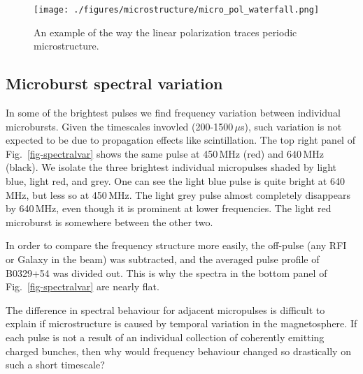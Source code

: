 \begin{figure}[!h]
\vspace{-0.1cm}
\begin{center}
\texttt{[image: ./figures/microstructure/micro\_pol\_waterfall.png]}
\caption{An example of the way the linear polarization 
     traces periodic microstructure.}
\label{fig-polwaterfall}
\end{center}
\end{figure}

\subsection{Microburst spectral variation}

In some of the brightest pulses we find frequency 
variation between individual microbursts. Given 
the timescales invovled (200-1500\,$\mu$s), such 
variation is not expected to be due to propagation 
effects like scintillation. The top right panel of 
Fig.~\ref{fig-spectralvar} shows the same pulse at 
450\,MHz (red) and 640\,MHz (black). We isolate the
three brightest individual micropulses shaded by 
light blue, light red, and grey. One can see the 
light blue pulse is quite bright at 640\,MHz, 
but less so at 450\,MHz. The light grey pulse almost 
completely disappears by 640\,MHz, even though 
it is prominent at lower frequencies. The light 
red microburst is somewhere between the other two.

In order to 
compare the frequency structure more easily, the off-pulse 
(any RFI or Galaxy in the beam) was subtracted, and the 
averaged pulse profile of B0329+54 was divided out.
This is why the spectra in the bottom panel of Fig.~\ref{fig-spectralvar}
are nearly flat. 

The difference in spectral behaviour for 
adjacent micropulses is difficult to explain 
if microstructure is caused by temporal 
variation in the magnetosphere. If each pulse is not a result 
of an individual collection of coherently emitting 
charged bunches, then why would frequency behaviour 
changed so drastically on such a short timescale?


